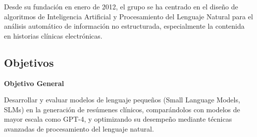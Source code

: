 \documentclass[../main.tex]{subfiles}
\begin{document}
Desde su fundación en enero de 2012, el grupo se ha centrado en el diseño de algoritmos de Inteligencia Artificial y Procesamiento del Lenguaje Natural para el análisis automático de información no estructurada, especialmente la contenida en historias clínicas electrónicas.

\subsection{Objetivos}
\textbf{Objetivo General}  

Desarrollar y evaluar modelos de lenguaje pequeños (Small Language Models, SLMs) en la generación de resúmenes clínicos,
comparándolos con modelos de mayor escala como GPT-4, y optimizando su desempeño mediante técnicas avanzadas de
procesamiento del lenguaje natural.
\end{document}

